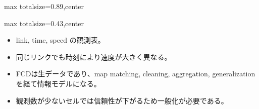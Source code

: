 \begin{minipage}[t]{0.58\textwidth}
\begin{adjustbox}{max totalsize={\textwidth}{0.89\textheight},center}
\begin{minipage}{\textwidth}
\end{minipage}
\end{adjustbox}
\end{minipage}


\clearpage
{}
\begin{minipage}[t]{0.405\textwidth}
\begin{adjustbox}{max totalsize={\textwidth}{0.43\textheight},center}
\begin{minipage}{\textwidth}\scriptsize
{}\begin{itemize}
\item link, time, speed の観測表。
\item 同じリンクでも時刻により速度が大きく異なる。
\end{itemize}\begin{itemize}
\item FCDは生データであり、map matching, cleaning, aggregation, generalization を経て情報モデルになる。
\item 観測数が少ないセルでは信頼性が下がるため一般化が必要である。
\end{itemize}
\end{minipage}
\end{adjustbox}
\end{minipage}\hfill
